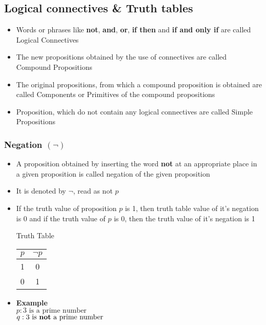 \documentclass{article}
\begin{document}
	\subsection{Logical connectives \& Truth tables}
	\begin{itemize}
		\item Words or phrases like \textbf{not}, \textbf{and}, \textbf{or}, \textbf{if then}
			and \textbf{if and only if} are called Logical Connectives
		\item The new propositions obtained by the use of connectives are called Compound Propositions
		\item The original propositions, from which a compound proposition is obtained are called
			Components or Primitives of the compound propositions
		\item Proposition, which do not contain any logical connectives are called Simple Propositions
	\end{itemize}

	\subsubsection{Negation $(\neg)$}
	\begin{itemize}
		\item A proposition obtained by inserting the word \textbf{not} at an appropriate place in a
			given proposition is called negation of the given proposition
		\item It is denoted by $\neg$, read as not $p$
		\item If the truth value of proposition $p$ is 1, then truth table value of it's negation is 0
			and if the truth value of $p$ is 0, then the truth value of it's negation is 1
			\begin{center}
				Truth Table \\ \vspace{1em}
				\begin{tabular}{|c|c|} \hline
					$p$ & $\neg p$ \\ \hline
					1 & 0 \\
					0 & 1 \\ \hline
				\end{tabular}
			\end{center}
		\item \textbf{Example} \\
			$p : \text{3 is a prime number}$ \\
			$q : \text{3 is \textbf{not} a prime number}$
	\end{itemize} \newpage
\end{document}
